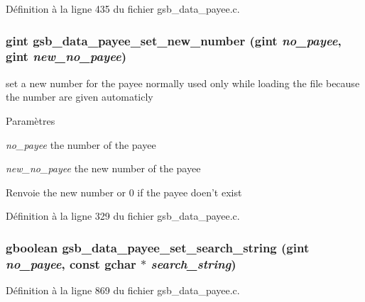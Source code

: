 Définition à la ligne 435 du fichier gsb\_\-data\_\-payee.c.

\subsubsection[{gsb\_\-data\_\-payee\_\-set\_\-new\_\-number}]{\setlength{\rightskip}{0pt plus 5cm}gint gsb\_\-data\_\-payee\_\-set\_\-new\_\-number (gint {\em no\_\-payee}, \/  gint {\em new\_\-no\_\-payee})}\label{gsb__data__payee_8c_a2797848d26057d372b174468814924be}
set a new number for the payee normally used only while loading the file because the number are given automaticly


\begin{DoxyParams}{Paramètres}
\item[{\em no\_\-payee}]the number of the payee \item[{\em new\_\-no\_\-payee}]the new number of the payee\end{DoxyParams}
\begin{DoxyReturn}{Renvoie}
the new number or 0 if the payee doen't exist 
\end{DoxyReturn}


Définition à la ligne 329 du fichier gsb\_\-data\_\-payee.c.

\subsubsection[{gsb\_\-data\_\-payee\_\-set\_\-search\_\-string}]{\setlength{\rightskip}{0pt plus 5cm}gboolean gsb\_\-data\_\-payee\_\-set\_\-search\_\-string (gint {\em no\_\-payee}, \/  const gchar $\ast$ {\em search\_\-string})}\label{gsb__data__payee_8c_a8347c14ccb3747b1b38bb6a9ef05719f}


Définition à la ligne 869 du fichier gsb\_\-data\_\-payee.c.

